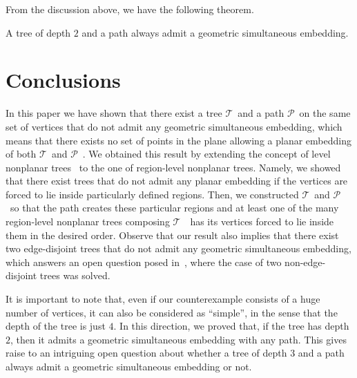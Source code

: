 \documentclass[a4paper,10pt]{llncs}
\newcommand{\T}{\mbox{$\mathcal T$ }}
\renewcommand{\P}{\mbox{$\mathcal P$ }}
\begin{document}
From the discussion above, we have the following theorem.

\begin{theorem}\label{th:depth2}
A tree of depth $2$ and a path always admit a geometric simultaneous embedding.
\end{theorem}

\section{Conclusions}\label{se:conclusions}

In this paper we have shown that there exist a tree \T and a path \P on the same set of vertices that do not admit any geometric simultaneous embedding, which means that there exists no set of points in the plane allowing a planar embedding of both \T and \P. We obtained this result by extending the concept of level nonplanar trees~\cite{fk-mlnpt-07} to the one of region-level nonplanar trees. Namely, we showed that there exist trees that do not admit any planar embedding if the vertices are forced to lie inside particularly defined regions. Then, we constructed \T and \P so that the path creates these particular regions and at least one of the many region-level nonplanar trees composing $\T$ has its vertices forced to lie inside them in the desired order. Observe that our result also implies that there exist two edge-disjoint trees that do not admit any geometric simultaneous embedding, which answers an open question posed in~\cite{gkv-ttsids-09}, where the case of two non-edge-disjoint trees was solved.

It is important to note that, even if our counterexample consists of a huge number of vertices, it can also be considered as ``simple'', in the sense that the depth of the tree is just $4$. In this direction, we proved that, if the tree has depth $2$, then it admits a geometric simultaneous embedding with any path. This gives raise to an intriguing open question about whether a tree of depth $3$ and a path always admit a geometric simultaneous embedding or not.



\end{document}
